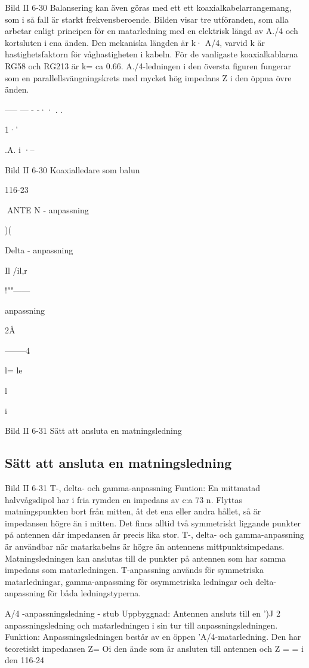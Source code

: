 {{Bild II 6-30
Balansering kan även göras med ett ett
koaxialkabelarrangemang, som i så fall är
starkt frekvensberoende. Bilden visar tre
utföranden, som alla arbetar enligt principen för en matarledning med en elektrisk
längd av A./4 och kortsluten i ena änden.
Den mekaniska längden är k· A/4, varvid
k är hastighetsfaktorn för våghastigheten i
kabeln. För de vanligaste koaxialkablarna
RG58 och RG213 är k= ca 0.66.
A./4-ledningen i den översta figuren fungerar som en parallellsvängningskrets med
mycket hög impedans Z i den öppna övre
änden.

----- --- - -·· . .

1·'

.A.
i ·--

Bild II 6-30 Koaxialledare som balun

116-23

ANTE N
- anpassning

)(

Delta - anpassning

Il
/il,r

!""------

anpassning

2Å

--------4

l= le~

l

i

Bild II 6-31 Sätt att ansluta en matningsledning

\subsection{Sätt att ansluta en matningsledning}

Bild II 6-31
T-, delta- och gamma-anpassning
Funtion: En mittmatad halvvågsdipol har
i fria rymden en impedans av c:a 73 n.
Flyttas matningspunkten bort från mitten, åt det ena eller andra hållet, så är
impedansen högre än i mitten.
Det finns alltid två symmetriskt liggande
punkter på antennen där impedansen är
precis lika stor.
T-, delta- och gamma-anpassning är användbar när matarkabelns
är högre än antennens mittpunktsimpedans. Matningsledningen kan anslutas till de punkter
på antennen som har samma impedans
som matarledningen. T-anpassning används för symmetriska matarledningar, gamma-anpassning för osymmetriska ledningar
och delta-anpassning för båda ledningstyperna.

A/4 -anpassningsledning - stub
Uppbyggnad: Antennen ansluts till en ')J
2 anpassningsledning och matarledningen
i sin tur till anpassningsledningen.
Funktion: Anpassningsledningen består
av en öppen 'A/4-matarledning. Den har
teoretiskt impedansen Z= Oi den ände som
är ansluten till antennen och Z = = i den
116-24

}}
